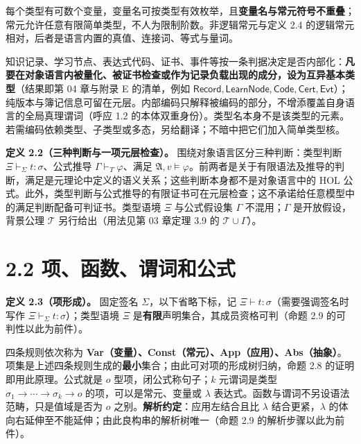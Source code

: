 \documentclass[UTF8,a4paper,zihao=-4,fontset=windows,openany]{ctexbook}
\newcommand{\mcsdisplay}[1]{%
  \par\addvspace{0.7em}%
  \sbox{\mcsmathbox}{\ensuremath{\displaystyle #1}}%
  \ifdim\wd\mcsmathbox>\linewidth
    \noindent\resizebox{\linewidth}{!}{\usebox{\mcsmathbox}}%
  \else
    \noindent\hspace*{\fill}\usebox{\mcsmathbox}\hspace*{\fill}%
  \fi
  \par\addvspace{0.7em}%
}
\def\ensuremath#1{#1}%
\begin{document}
每个类型有可数个变量，变量名可按类型有效枚举，且\textbf{变量名与常元符号不重叠}；常元允许任意有限简单类型，不人为限制阶数。非逻辑常元与定义 2.4 的逻辑常元相对，后者是语言内置的真值、连接词、等式与量词。

知识记录、学习节点、表达式代码、证书、事件等按一条判据决定是否内部化：\textbf{凡要在对象语言内被量化、被证书检查或作为记录负载出现的成分，设为互异基本类型}（结果即第 04 章与附录 E 的清单，例如 \(\mathsf{Record},\mathsf{LearnNode},\mathsf{Code},\mathsf{Cert},\mathsf{Evt}\)）；纯版本与簿记信息可留在元层。内部编码只解释被编码的部分，不增添覆盖自身语言的全局真理谓词（呼应 1.2 的本体双重身份）。类型名本身不是该类型的元素。若需编码依赖类型、子类型或多态，另给翻译；不暗中把它们加入简单类型核。

\textbf{定义 2.2（三种判断与一项元层检查）。} 围绕对象语言区分三种判断：类型判断 \(\Xi\vdash_\Sigma t:\sigma\)、公式推导 \(\Gamma\vdash_T\varphi\)、满足 \(\mathfrak A,v\models\varphi\)。前两者是关于有限语法及推导的判断，满足是元理论中定义的语义关系；这些判断本身都不是对象语言中的 HOL 公式。此外，类型判断与公式推导的有限证书可在元层检查；这不承诺给任意模型中的满足判断配备可判证书。类型语境 \(\Xi\) 与公式假设集 \(\Gamma\) 不混用；\(\Gamma\) 是开放假设，背景公理 \(\mathcal T\) 另行给出（用法见第 03 章定理 3.9 的 \(\mathcal T\cup\Gamma\)）。

\section{2.2 项、函数、谓词和公式}
\textbf{定义 2.3（项形成）。} 固定签名 \(\Sigma\)，以下省略下标，记 \(\Xi\vdash t:\sigma\)（需要强调签名时写作 \(\Xi\vdash_\Sigma t:\sigma\)）；类型语境 \(\Xi\) 是\textbf{有限}声明集合，其成员资格可判（命题 2.9 的可判性以此为前件）。


\mcsdisplay{\frac{x:\sigma\in\Xi}{\Xi\vdash x:\sigma}\quad
\frac{c:\sigma\in\Sigma}{\Xi\vdash c:\sigma}\quad
\frac{\Xi\vdash f:\sigma\to\tau\quad\Xi\vdash u:\sigma}
{\Xi\vdash fu:\tau}\quad
\frac{\Xi,x:\sigma\vdash t:\tau}
{\Xi\vdash\lambda x:\sigma.t:\sigma\to\tau}.}
\noindent 四条规则依次称为 \textbf{Var（变量）、Const（常元）、App（应用）、Abs（抽象）}。项集是上述四条规则生成的\textbf{最小}集合；由此可对项的形成树归纳，命题 2.8 的证明即用此原理。公式就是 \(o\) 型项，闭公式称句子；\(k\) 元谓词是类型 \(\sigma_1\to\cdots\to\sigma_k\to o\) 的项，可以是常元、变量或 \(\lambda\) 表达式。函数与谓词不另设语法范畴，只是值域是否为 \(o\) 之别。\textbf{解析约定}：应用左结合且比 \(\lambda\) 结合更紧，\(\lambda\) 的体向右延伸至不能延伸；由此良构串的解析树唯一（命题 2.9 的解析步骤以此为前件）。
\end{document}
